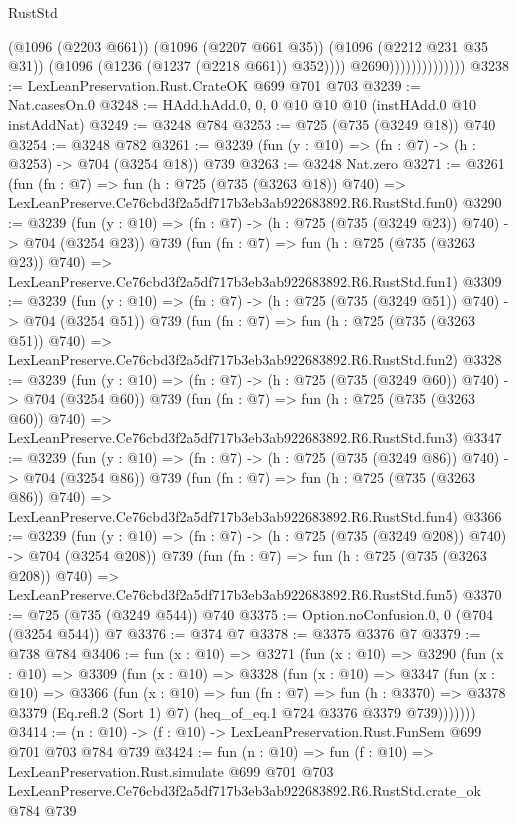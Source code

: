 \begin{lexlean}{RustStd}
\begin{coremodule}
                                    (@1096 (@2203 @661))
                                    (@1096 (@2207 @661 @35))
                                    (@1096 (@2212 @231 @35 @31))
                                    (@1096 (@1236 (@1237 (@2218 @661)) @352))))
                                @2690))))))))))))))
@3238 := LexLeanPreservation.Rust.CrateOK @699 @701 @703
@3239 := Nat.casesOn.{0}
@3248 := HAdd.hAdd.{0, 0, 0} @10 @10 @10 (instHAdd.{0} @10 instAddNat)
@3249 := @3248 @784
@3253 := @725 (@735 (@3249 @18)) @740
@3254 := @3248 @782
@3261 := @3239 (fun (y : @10) => (fn : @7) -> (h : @3253) -> @704 (@3254 @18)) @739
@3263 := @3248 Nat.zero
@3271 := @3261
    (fun (fn : @7) =>
    fun (h : @725 (@735 (@3263 @18)) @740) =>
    LexLeanPreserve.Ce76cbd3f2a5df717b3eb3ab922683892.R6.RustStd.fun0)
@3290 := @3239
    (fun (y : @10) => (fn : @7) -> (h : @725 (@735 (@3249 @23)) @740) -> @704 (@3254 @23))
    @739
    (fun (fn : @7) =>
    fun (h : @725 (@735 (@3263 @23)) @740) =>
    LexLeanPreserve.Ce76cbd3f2a5df717b3eb3ab922683892.R6.RustStd.fun1)
@3309 := @3239
    (fun (y : @10) => (fn : @7) -> (h : @725 (@735 (@3249 @51)) @740) -> @704 (@3254 @51))
    @739
    (fun (fn : @7) =>
    fun (h : @725 (@735 (@3263 @51)) @740) =>
    LexLeanPreserve.Ce76cbd3f2a5df717b3eb3ab922683892.R6.RustStd.fun2)
@3328 := @3239
    (fun (y : @10) => (fn : @7) -> (h : @725 (@735 (@3249 @60)) @740) -> @704 (@3254 @60))
    @739
    (fun (fn : @7) =>
    fun (h : @725 (@735 (@3263 @60)) @740) =>
    LexLeanPreserve.Ce76cbd3f2a5df717b3eb3ab922683892.R6.RustStd.fun3)
@3347 := @3239
    (fun (y : @10) => (fn : @7) -> (h : @725 (@735 (@3249 @86)) @740) -> @704 (@3254 @86))
    @739
    (fun (fn : @7) =>
    fun (h : @725 (@735 (@3263 @86)) @740) =>
    LexLeanPreserve.Ce76cbd3f2a5df717b3eb3ab922683892.R6.RustStd.fun4)
@3366 := @3239
    (fun (y : @10) => (fn : @7) -> (h : @725 (@735 (@3249 @208)) @740) -> @704 (@3254 @208))
    @739
    (fun (fn : @7) =>
    fun (h : @725 (@735 (@3263 @208)) @740) =>
    LexLeanPreserve.Ce76cbd3f2a5df717b3eb3ab922683892.R6.RustStd.fun5)
@3370 := @725 (@735 (@3249 @544)) @740
@3375 := Option.noConfusion.{0, 0} (@704 (@3254 @544)) @7
@3376 := @374 @7
@3378 := @3375 @3376 @7
@3379 := @738 @784
@3406 := fun (x : @10) =>
  @3271
    (fun (x : @10) =>
    @3290
      (fun (x : @10) =>
      @3309
        (fun (x : @10) =>
        @3328
          (fun (x : @10) =>
          @3347
            (fun (x : @10) =>
            @3366
              (fun (x : @10) =>
              fun (fn : @7) =>
              fun (h : @3370) =>
              @3378 @3379 (Eq.refl.{2} (Sort 1) @7) (heq_of_eq.{1} @724 @3376 @3379 @739)))))))
@3414 := (n : @10) -> (f : @10) -> LexLeanPreservation.Rust.FunSem @699 @701 @703 @784 @739
@3424 := fun (n : @10) =>
  fun (f : @10) =>
  LexLeanPreservation.Rust.simulate
    @699
    @701
    @703
    LexLeanPreserve.Ce76cbd3f2a5df717b3eb3ab922683892.R6.RustStd.crate_ok
    @784
    @739
\end{coremodule}
\end{lexlean}
